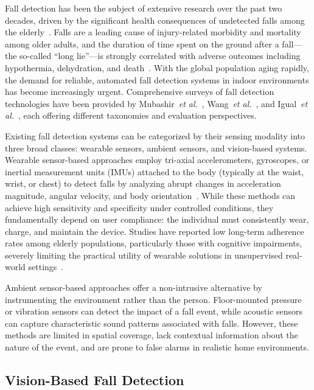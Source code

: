 Fall detection has been the subject of extensive research over the past two decades, driven by the significant health consequences of undetected falls among the elderly~\cite{who2007falls, tinetti1988risk}. Falls are a leading cause of injury-related morbidity and mortality among older adults, and the duration of time spent on the ground after a fall---the so-called ``long lie''---is strongly correlated with adverse outcomes including hypothermia, dehydration, and death~\cite{lord2007falls}. With the global population aging rapidly, the demand for reliable, automated fall detection systems in indoor environments has become increasingly urgent. Comprehensive surveys of fall detection technologies have been provided by Mubashir~\emph{et al.}~\cite{mubashir2013survey}, Wang~\emph{et al.}~\cite{wang2020elderly}, and Igual~\emph{et al.}~\cite{igual2013challenges}, each offering different taxonomies and evaluation perspectives.

Existing fall detection systems can be categorized by their sensing modality into three broad classes: wearable sensors, ambient sensors, and vision-based systems. Wearable sensor-based approaches employ tri-axial accelerometers, gyroscopes, or inertial measurement units (IMUs) attached to the body (typically at the waist, wrist, or chest) to detect falls by analyzing abrupt changes in acceleration magnitude, angular velocity, and body orientation~\cite{mubashir2013survey}. While these methods can achieve high sensitivity and specificity under controlled conditions, they fundamentally depend on user compliance: the individual must consistently wear, charge, and maintain the device. Studies have reported low long-term adherence rates among elderly populations, particularly those with cognitive impairments, severely limiting the practical utility of wearable solutions in unsupervised real-world settings~\cite{lord2007falls}.

Ambient sensor-based approaches offer a non-intrusive alternative by instrumenting the environment rather than the person. Floor-mounted pressure or vibration sensors can detect the impact of a fall event, while acoustic sensors can capture characteristic sound patterns associated with falls. However, these methods are limited in spatial coverage, lack contextual information about the nature of the event, and are prone to false alarms in realistic home environments.

\subsection*{Vision-Based Fall Detection}

